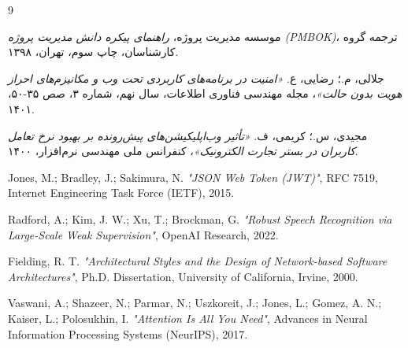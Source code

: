 \documentclass[11pt, a4paper]{report}
\begin{document}
\clearpage
{}
\renewcommand{\bibname}{منابع و مراجع}
\begin{thebibliography}{9}

موسسه مدیریت پروژه، \textit{راهنمای پیکره دانش مدیریت پروژه (PMBOK)}، ترجمه گروه کارشناسان، چاپ سوم، تهران، ۱۳۹۸.

جلالی، م.؛ رضایی، ع. \textit{«امنیت در برنامه‌های کاربردی تحت وب و مکانیزم‌های احراز هویت بدون حالت»}، مجله مهندسی فناوری اطلاعات، سال نهم، شماره ۳، صص ۳۵-۵۰، ۱۴۰۱.

مجیدی، س.؛ کریمی، ف. \textit{«تأثیر وب‌اپلیکیشن‌های پیش‌رونده بر بهبود نرخ تعامل کاربران در بستر تجارت الکترونیک»}، کنفرانس ملی مهندسی نرم‌افزار، ۱۴۰۰.

Jones, M.; Bradley, J.; Sakimura, N. \textit{"JSON Web Token (JWT)"}, RFC 7519, Internet Engineering Task Force (IETF), 2015.

Radford, A.; Kim, J. W.; Xu, T.; Brockman, G. \textit{"Robust Speech Recognition via Large-Scale Weak Supervision"}, OpenAI Research, 2022.

Fielding, R. T. \textit{"Architectural Styles and the Design of Network-based Software Architectures"}, Ph.D. Dissertation, University of California, Irvine, 2000.

Vaswani, A.; Shazeer, N.; Parmar, N.; Uszkoreit, J.; Jones, L.; Gomez, A. N.; Kaiser, L.; Polosukhin, I. \textit{"Attention Is All You Need"}, Advances in Neural Information Processing Systems (NeurIPS), 2017.

\end{thebibliography}
\end{document}
